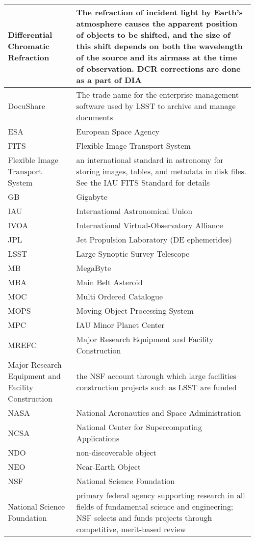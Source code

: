 \begin{longtable}{|p{}|p{}|}
Differential Chromatic Refraction & The refraction of incident light by Earth's atmosphere causes the apparent position of objects to be shifted, and the size of this shift depends on both the wavelength of the source and its \gls{airmass} at the time of observation. \gls{DCR} corrections are done as a part of \gls{DIA} \\\hline
DocuShare & The trade name for the enterprise management software used by \gls{LSST} to archive and manage documents \\\hline
ESA & European Space Agency \\\hline
FITS & \gls{Flexible Image Transport System} \\\hline
Flexible Image Transport System & an international standard in astronomy for storing images, tables, and \gls{metadata} in disk files. See the \gls{IAU} \gls{FITS} Standard for details \\\hline
GB & Gigabyte \\\hline
IAU & International Astronomical Union \\\hline
IVOA & International Virtual-Observatory Alliance \\\hline
JPL & Jet Propulsion Laboratory (DE ephemerides) \\\hline
LSST & Large Synoptic Survey Telescope \\\hline
MB & MegaByte \\\hline
MBA & Main Belt Asteroid \\\hline
MOC & Multi Ordered Catalogue \\\hline
MOPS & \gls{Moving Object Processing System} \\\hline
MPC & \gls{IAU} Minor Planet \gls{Center} \\\hline
MREFC & Major Research Equipment and Facility \gls{Construction} \\\hline
Major Research Equipment and Facility \gls{Construction} & the \gls{NSF} account through which large facilities construction projects such as \gls{LSST} are funded \\\hline
NASA & National Aeronautics and Space Administration \\\hline
NCSA & National \gls{Center} for Supercomputing Applications \\\hline
NDO & non-discoverable object \\\hline
NEO & Near-Earth \gls{Object} \\\hline
NSF & \gls{National Science Foundation} \\\hline
National Science Foundation & primary federal agency supporting research in all fields of fundamental science and engineering; \gls{NSF} selects and funds projects through competitive, merit-based review \\\hline

\end{longtable}
